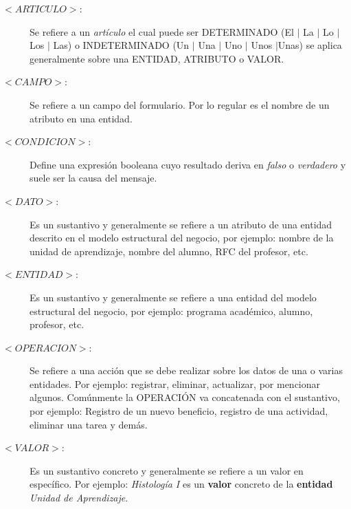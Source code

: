 \begin{description}
	\item [$<ARTICULO>$:] Se refiere a un {\em artículo} el cual puede ser DETERMINADO (El $\mid$ La $\mid$ Lo $\mid$ Los $\mid$ Las) o INDETERMINADO (Un $\mid$ Una $\mid$ 
	Uno $\mid$ Unos $\mid$Unas) se aplica generalmente sobre una ENTIDAD, ATRIBUTO o VALOR.
	
	\item [$<CAMPO>$:] Se refiere a un campo del formulario. Por lo regular es el nombre de un atributo en una entidad.

	\item [$<CONDICION>$:] Define una expresión booleana cuyo resultado deriva en {\em falso} o {\em verdadero} y suele ser la causa del mensaje.
	
	\item [$<DATO>$:] Es un sustantivo y generalmente se refiere a un atributo de una entidad descrito en el modelo estructural del negocio, por ejemplo: nombre de la unidad de aprendizaje, nombre del alumno, RFC del profesor, etc. %
	
	\item [$<ENTIDAD>$:] Es un sustantivo y generalmente se refiere a una entidad del modelo estructural del negocio, por ejemplo: programa académico, alumno, profesor, etc.
	\item [$<OPERACION>$:] Se refiere a una acción que se debe realizar sobre los datos de una o varias entidades. Por ejemplo: registrar, eliminar, actualizar, por mencionar algunos. Comúnmente la OPERACIÓN va concatenada con el sustantivo, por ejemplo: Registro de un nuevo beneficio, registro de una actividad, eliminar una tarea y demás.
	
	\item [$<VALOR>$:] Es un sustantivo concreto y generalmente se refiere a un valor en específico. Por ejemplo: \textit{Histología I} es un \textbf{valor} concreto de la \textbf{entidad} \textit{Unidad de Aprendizaje}.
	
\end{description}


